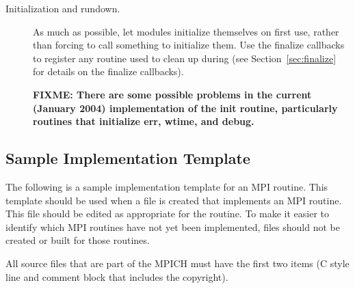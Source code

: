 \documentclass{article}
\def\fixme#1{\marginpar{FIXME:}\textbf{FIXME: #1}}
\begin{document}
\begin{description}
\item[Initialization and rundown.] As much as possible, let modules initialize 
themselves on first use, rather than forcing  to call
something 
to initialize them.  Use the finalize callbacks to register any routine used
to clean up during  (see Section~\ref{sec:finalize}
for details on the finalize callbacks).

\fixme{There are some possible problems in the current (January 2004)
  implementation of the init routine, particularly routines that
  initialize err, wtime, and debug.}

\end{description}

\subsection{Sample Implementation Template}
\label{sec:template}

The following is a sample implementation template for an MPI routine.
This template should be used when a file is created that implements an
MPI routine.  This file should be edited as appropriate for the
routine.  To make it easier to identify which MPI routines have not
yet been implemented, files should not be created or built for those routines.

All source files that are part of the MPICH must have the first two
items (C style line and comment block that includes the copyright).
\end{document}
